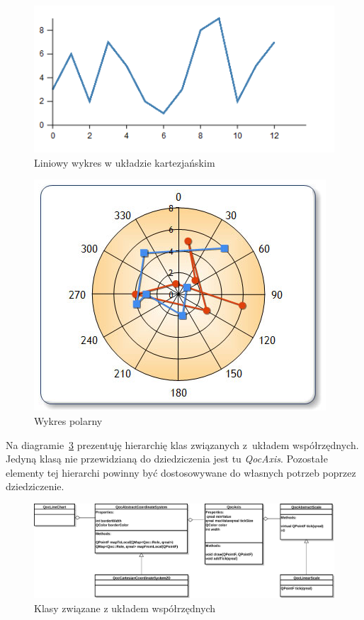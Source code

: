 \begin{figure}[H]
\centering
\includegraphics[scale=0.65]{img/kartezjanski.png}
\caption{Liniowy wykres w układzie kartezjańskim}\label{rys:uk:kart}
\end{figure}

\begin{figure}[H]
\centering
\includegraphics[scale=0.65]{img/biegunowy.png}
\caption{Wykres polarny}\label{rys:uk:bieg}
\end{figure}

Na diagramie~\ref{rys:os:skala} prezentuję hierarchię klas związanych z~układem współrzędnych. Jedyną klasą nie przewidzianą do dziedziczenia jest tu \textit{QocAxis}. Pozostałe elementy tej hierarchi powinny być dostosowywane do własnych potrzeb poprzez dziedziczenie.

\begin{figure}[H]
\centering
\includegraphics[scale=0.5]{img/os_skala.pdf}
\caption{Klasy związane z układem współrzędnych}\label{rys:os:skala}
\end{figure}

